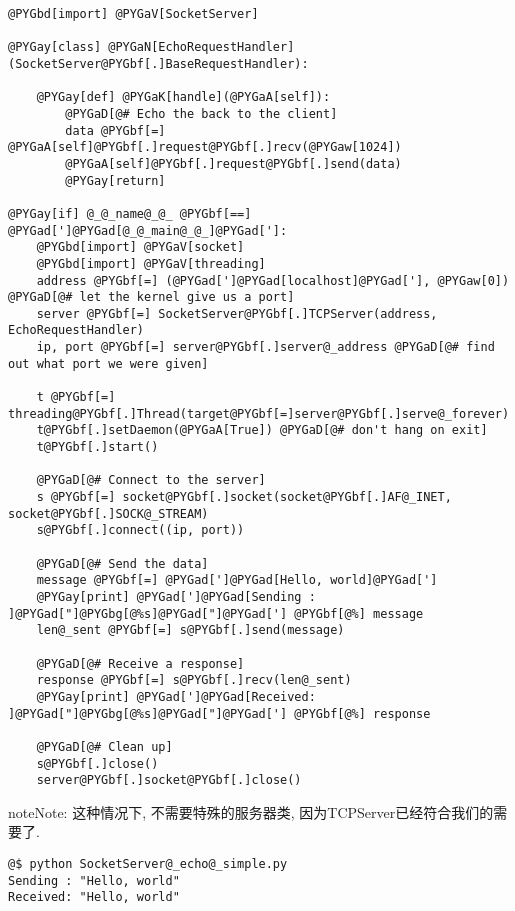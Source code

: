 \documentclass[a4paper,10pt,english]{manual}
\begin{document}
\begin{Verbatim}[commandchars=@\[\]]
@PYGbd[import] @PYGaV[SocketServer]

@PYGay[class] @PYGaN[EchoRequestHandler](SocketServer@PYGbf[.]BaseRequestHandler):

    @PYGay[def] @PYGaK[handle](@PYGaA[self]):
        @PYGaD[@# Echo the back to the client]
        data @PYGbf[=] @PYGaA[self]@PYGbf[.]request@PYGbf[.]recv(@PYGaw[1024])
        @PYGaA[self]@PYGbf[.]request@PYGbf[.]send(data)
        @PYGay[return]

@PYGay[if] @_@_name@_@_ @PYGbf[==] @PYGad[']@PYGad[@_@_main@_@_]@PYGad[']:
    @PYGbd[import] @PYGaV[socket]
    @PYGbd[import] @PYGaV[threading]
    address @PYGbf[=] (@PYGad[']@PYGad[localhost]@PYGad['], @PYGaw[0]) @PYGaD[@# let the kernel give us a port]
    server @PYGbf[=] SocketServer@PYGbf[.]TCPServer(address, EchoRequestHandler)
    ip, port @PYGbf[=] server@PYGbf[.]server@_address @PYGaD[@# find out what port we were given]

    t @PYGbf[=] threading@PYGbf[.]Thread(target@PYGbf[=]server@PYGbf[.]serve@_forever)
    t@PYGbf[.]setDaemon(@PYGaA[True]) @PYGaD[@# don't hang on exit]
    t@PYGbf[.]start()

    @PYGaD[@# Connect to the server]
    s @PYGbf[=] socket@PYGbf[.]socket(socket@PYGbf[.]AF@_INET, socket@PYGbf[.]SOCK@_STREAM)
    s@PYGbf[.]connect((ip, port))

    @PYGaD[@# Send the data]
    message @PYGbf[=] @PYGad[']@PYGad[Hello, world]@PYGad[']
    @PYGay[print] @PYGad[']@PYGad[Sending : ]@PYGad["]@PYGbg[@%s]@PYGad["]@PYGad['] @PYGbf[@%] message
    len@_sent @PYGbf[=] s@PYGbf[.]send(message)

    @PYGaD[@# Receive a response]
    response @PYGbf[=] s@PYGbf[.]recv(len@_sent)
    @PYGay[print] @PYGad[']@PYGad[Received: ]@PYGad["]@PYGbg[@%s]@PYGad["]@PYGad['] @PYGbf[@%] response

    @PYGaD[@# Clean up]
    s@PYGbf[.]close()
    server@PYGbf[.]socket@PYGbf[.]close()
\end{Verbatim}

\begin{notice}{note}{Note:}
这种情况下, 不需要特殊的服务器类, 因为TCPServer已经符合我们的需要了.
\end{notice}

\begin{Verbatim}[commandchars=@\[\]]
@$ python SocketServer@_echo@_simple.py
Sending : "Hello, world"
Received: "Hello, world"
\end{Verbatim}
\end{document}
